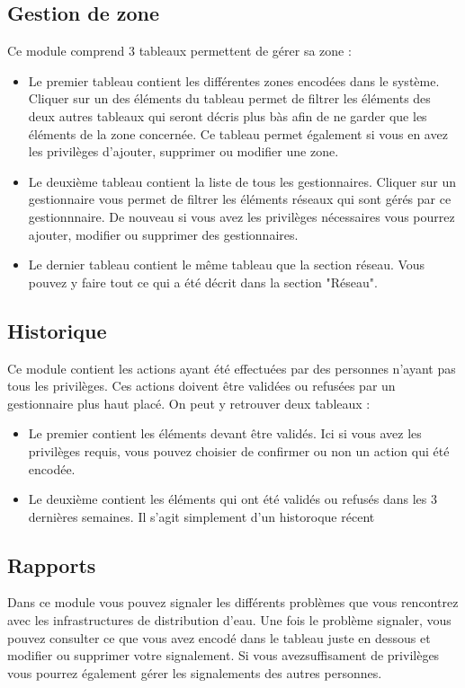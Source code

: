 \documentclass{EPL-master-thesis-covers-FR}
\begin{document}
			\subsection{Gestion de zone}
				Ce module comprend 3 tableaux permettent de gérer sa zone :
				\begin{itemize}
					\item Le premier tableau contient les différentes zones encodées dans le système. Cliquer sur un des éléments du tableau permet de filtrer les éléments des deux autres tableaux qui seront décris plus bàs afin de ne garder que les éléments de la zone concernée. Ce tableau permet également si vous en avez les privilèges d'ajouter, supprimer ou modifier une zone.
					\item Le deuxième tableau contient la liste de tous les gestionnaires. Cliquer sur un gestionnaire vous permet de filtrer les éléments réseaux qui sont gérés par ce gestionnnaire. De nouveau si vous avez les privilèges nécessaires vous pourrez ajouter, modifier ou supprimer des gestionnaires.
					\item Le dernier tableau contient le même tableau que la section réseau. Vous pouvez y faire tout ce qui a été décrit dans la section "Réseau".
				\end{itemize}
			
			\subsection{Historique}
				Ce module contient les actions ayant été effectuées par des personnes n'ayant pas tous les privilèges. Ces actions doivent être validées ou refusées par un gestionnaire plus haut placé. On peut y retrouver deux tableaux :
				\begin{itemize}
					\item Le premier contient les éléments devant être validés. Ici si vous avez les privilèges requis, vous pouvez choisier de confirmer ou non un action qui été encodée.
					\item Le deuxième contient les éléments qui ont été validés ou refusés dans les 3 dernières semaines. Il s'agit simplement d'un historoque récent
				\end{itemize}
			
			\subsection{Rapports}
				Dans ce module vous pouvez signaler les différents problèmes que vous rencontrez avec les infrastructures de distribution d'eau. Une fois le problème signaler, vous pouvez consulter ce que vous avez encodé dans le tableau juste en dessous et modifier ou supprimer votre signalement. Si vous avezsuffisament de privilèges vous pourrez également gérer les signalements des autres personnes.
				
\end{document}
